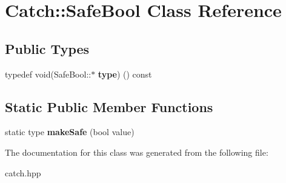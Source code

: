 \hypertarget{class_catch_1_1_safe_bool}{}\section{Catch\+:\+:Safe\+Bool Class Reference}
\label{class_catch_1_1_safe_bool}
\subsection*{Public Types}
\begin{DoxyCompactItemize}
\item 
\mbox{\label{class_catch_1_1_safe_bool_a39eef9baed296299d625a54d54a2a958}} 
typedef void(Safe\+Bool\+::$\ast$ {\bfseries type}) () const
\end{DoxyCompactItemize}
\subsection*{Static Public Member Functions}
\begin{DoxyCompactItemize}
\item 
\mbox{\label{class_catch_1_1_safe_bool_af0ea63d9820f8bf7a8b76377913c4e77}} 
static type {\bfseries make\+Safe} (bool value)
\end{DoxyCompactItemize}


The documentation for this class was generated from the following file\+:\begin{DoxyCompactItemize}
\item 
catch.\+hpp\end{DoxyCompactItemize}
